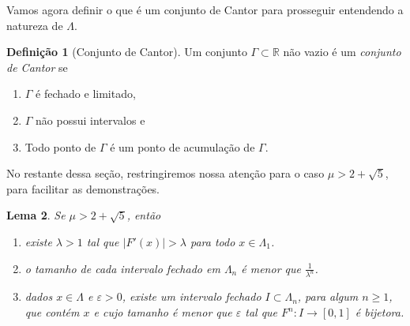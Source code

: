 \documentclass[a4paper, 12pt]{article}
\theoremstyle{definition}
\newtheorem{definition}{Definição}[section]
\theoremstyle{plain}
\theoremstyle{plain}
\newtheorem{lemma}[definition]{Lema}
\theoremstyle{plain}
\theoremstyle{definition}
\theoremstyle{remark}
\newcommand{\RR}{\mathbb{R}}
\begin{document}
Vamos agora definir o que é um conjunto de Cantor para prosseguir entendendo a natureza de $\Lambda$.

\begin{definition}[Conjunto de Cantor]
Um conjunto $\Gamma \subset \RR$ não vazio é um \textit{conjunto de Cantor} se
\begin{enumerate}
\item $\Gamma$ é fechado e limitado,
\item $\Gamma$ não possui intervalos e
\item Todo ponto de $\Gamma$ é um ponto de acumulação de $\Gamma$.
\end{enumerate}
\end{definition}

No restante dessa seção, restringiremos nossa atenção para o caso $\mu > 2 + \sqrt{5}$, para facilitar as demonstrações.

\begin{lemma}
\label{lemma 4 1}
Se $\mu > 2 + \sqrt{5}$, então
\begin{enumerate}
\item  existe $\lambda > 1$ tal que $|F'(x)| > \lambda$ para todo $x \in \Lambda_1$.
\item o tamanho de cada intervalo fechado em $\Lambda_n$ é menor que $\frac{1}{\lambda^n}$.
\item dados $x \in \Lambda$ e $\varepsilon > 0$, existe um intervalo fechado $I \subset \Lambda_n$, para algum $n \geq 1$,  que contém $x$ e cujo tamanho é menor que $\varepsilon$ tal que $F^n: I \to [0,1]$ é bijetora.
\end{enumerate}
\end{lemma}
\end{document}
